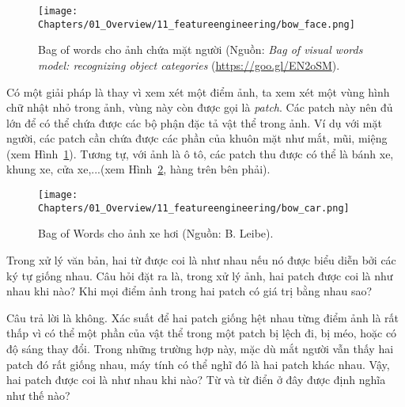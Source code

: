 \begin{figure}[t]
\centering
    \texttt{[image: Chapters/01\_Overview/11\_featureengineering/bow\_face.png]}
    \caption[]{Bag of words cho ảnh chứa mặt người (Nguồn: \textit{Bag of
    visual words model: recognizing object categories}
    (\url{https://goo.gl/EN2oSM}).}
    \label{fig:11_2}
\end{figure}

Có một giải pháp là thay vì xem xét một điểm ảnh, ta xem xét một vùng hình chữ
nhật nhỏ trong ảnh, vùng này còn được gọi là \textit{patch}. Các patch này nên
đủ lớn để có thể chứa được các bộ phận đặc tả vật thể trong ảnh. Ví dụ với mặt
người, các patch cần chứa được các phần của khuôn mặt như mắt, mũi, miệng (xem
Hình~\ref{fig:11_2}). Tương tự, với ảnh là ô tô, các patch thu được có thể là
bánh xe, khung xe, cửa xe,...(xem Hình~\ref{fig:11_3}, hàng trên bên phải).
\begin{figure}[t]
\centering
    \texttt{[image: Chapters/01\_Overview/11\_featureengineering/bow\_car.png]}
    \caption[]{Bag of Words cho ảnh xe hơi (Nguồn: B. Leibe).}
    \label{fig:11_3}
\end{figure}
 
Trong xử lý văn bản, hai từ được coi là như nhau nếu nó được biểu diễn bởi các
ký tự giống nhau. Câu hỏi đặt ra là, trong xử lý ảnh, hai patch được coi là như
nhau khi nào? Khi mọi điểm ảnh trong hai patch có giá trị bằng nhau sao?
 
Câu trả lời là không. Xác suất để hai patch giống hệt nhau từng điểm ảnh là rất
thấp vì có thể một phần của vật thể trong một patch bị lệch đi, bị
méo, hoặc có độ sáng thay đổi. Trong những trường hợp này, mặc dù mắt người vẫn
thấy hai patch đó {rất giống nhau}, máy tính có thể nghĩ đó là hai patch
khác nhau. Vậy, hai patch được coi là như nhau khi nào? Từ và {từ điển} ở
đây được định nghĩa như thế nào?
 
 
